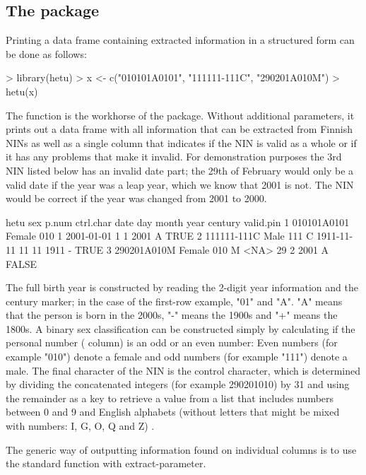\subsection{The  package}

Printing a data frame containing extracted information in a structured form can be done as follows:

\begin{example}
 > library(hetu)
 > x <- c("010101A0101", "111111-111C", "290201A010M")
 > hetu(x)
\end{example}

The  function is the workhorse of the  package. Without additional parameters, it prints out a data frame with all information that can be extracted from Finnish NINs as well as a single column that indicates if the NIN is valid as a whole or if it has any problems that make it invalid. For demonstration purposes the 3rd NIN listed below has an invalid date part; the 29th of February would only be a valid date if the year was a leap year, which we know that 2001 is not. The NIN would be correct if the year was changed from 2001 to 2000.

\begin{example}
         hetu    sex p.num ctrl.char       date day month year century valid.pin
1 010101A0101 Female   010         1 2001-01-01   1     1 2001       A      TRUE
2 111111-111C   Male   111         C 1911-11-11  11    11 1911       -      TRUE
3 290201A010M Female   010         M       <NA>  29     2 2001       A     FALSE
\end{example}

The full birth year is constructed by reading the 2-digit year information and the century marker; in the case of the first-row example, "01" and "A". "A" means that the person is born in the 2000s, "-" means the 1900s and "+" means the 1800s. A binary sex classification can be constructed simply by calculating if the personal number ( column) is an odd or an even number: Even numbers (for example "010") denote a female and odd numbers (for example "111") denote a male. The final character of the NIN is the control character, which is determined by dividing the concatenated integers (for example 290201010) by 31 and using the remainder as a key to retrieve a value from a list that includes numbers between 0 and 9 and English alphabets (without letters that might be mixed with numbers: I, G, O, Q and Z) \citep{hetudvv, salste2021}.

The generic way of outputting information found on individual columns is to use the standard  function with extract-parameter.

